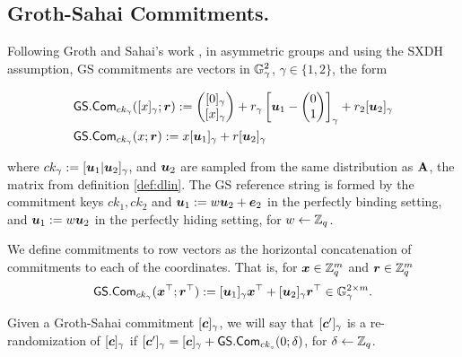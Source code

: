 \subsection{Groth-Sahai Commitments.}
Following Groth and Sahai's work \cite{EC:GroSah08}, in asymmetric groups and using the SXDH assumption, GS commitments are vectors in $\mathbb{G}^2_\gamma$, $\gamma\in\{1,2\}$, the form
\begin{small}\begin{align*}
&{\mathsf{GS}}.\mathsf{Com}_{ck_\gamma}([x]_\gamma;{\boldsymbol{r}}):=\left(\begin{matrix}{[0]_\gamma}\\{[x]_\gamma}\end{matrix}\right)+r_\gamma\left[{\boldsymbol{u}}_1-\left(\begin{matrix}0\\1\end{matrix}\right)\right]_\gamma+{r}_2[{\boldsymbol{u}}_2]_\gamma\\
&{\mathsf{GS}}.\mathsf{Com}_{ck_\gamma}(x;{\boldsymbol{r}}):=x[{\boldsymbol{u}}_1]_\gamma+{r}[{\boldsymbol{u}}_2]_\gamma
\end{align*}\end{small}
where $ck_\gamma:=[{\boldsymbol{u}}_1|{\boldsymbol{u}}_2]_\gamma$, and ${\boldsymbol{u}}_2$ are sampled from the same distribution as $\mathbf{{A}}$, the matrix from definition \ref{def:dlin}. The GS reference string is formed by the commitment keys $ck_1,ck_2$  and ${\boldsymbol{u}}_1:=w{\boldsymbol{u}}_2+{\boldsymbol{e}}_2$ in the perfectly binding setting, and ${\boldsymbol{u}}_1:=w{\boldsymbol{u}}_2$ in the perfectly hiding setting, for $w\gets\mathbb{Z}_q$.

We define commitments to row vectors as the horizontal concatenation of commitments to each of the coordinates. That is, for ${\boldsymbol{x}}\in\mathbb{Z}_q^m$ and ${\boldsymbol{r}}\in\mathbb{Z}_q^m$
\begin{align*}
{\mathsf{GS}}.\mathsf{Com}_{ck_\gamma}({\boldsymbol{x}}^\top;{\boldsymbol{r}}^\top) := [{\boldsymbol{u}}_1]_\gamma{\boldsymbol{x}}^\top+[{\boldsymbol{u}}_2]_\gamma{\boldsymbol{r}}^\top\in\mathbb{G}_\gamma^{2\times m}.
\end{align*}

Given a Groth-Sahai commitment $[{\boldsymbol{c}}]_\gamma$, we will say that $[{\boldsymbol{c}}']_\gamma$ is a re-randomization of $[{\boldsymbol{c}}]_\gamma$ if $[{\boldsymbol{c}}']_\gamma = [{\boldsymbol{c}}]_\gamma + {\mathsf{GS}}.\mathsf{Com}_{ck_s}(0;\delta)$, for $\delta\gets\mathbb{Z}_q$.
